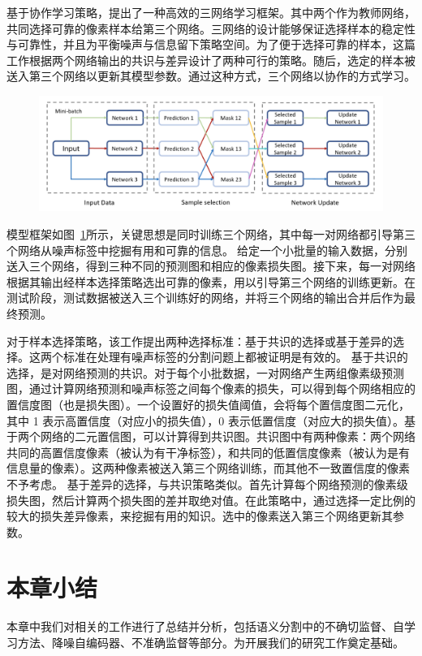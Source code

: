 \citet{Zhang2020RobustMI} 基于协作学习策略，提出了一种高效的三网络学习框架。其中两个作为教师网络，共同选择可靠的像素样本给第三个网络。三网络的设计能够保证选择样本的稳定性与可靠性，并且为平衡噪声与信息留下策略空间。为了便于选择可靠的样本，这篇工作根据两个网络输出的共识与差异设计了两种可行的策略。随后，选定的样本被送入第三个网络以更新其模型参数。通过这种方式，三个网络以协作的方式学习。
    \begin{figure}[tbp]
        \centering 
        \includegraphics[width=1.0\textwidth]{img/c2/rel_c3.png}
        \label{c2_fig13}
    \end{figure}
模型框架如图~\ref{c2_fig13}所示，关键思想是同时训练三个网络，其中每一对网络都引导第三个网络从噪声标签中挖掘有用和可靠的信息。给定一个小批量的输入数据，分别送入三个网络，得到三种不同的预测图和相应的像素损失图。接下来，每一对网络根据其输出经样本选择策略选出可靠的像素，用以引导第三个网络的训练更新。在测试阶段，测试数据被送入三个训练好的网络，并将三个网络的输出合并后作为最终预测。

对于样本选择策略，该工作提出两种选择标准：基于共识的选择或基于差异的选择。这两个标准在处理有噪声标签的分割问题上都被证明是有效的。
基于共识的选择，是对网络预测的共识。对于每个小批数据，一对网络产生两组像素级预测图，通过计算网络预测和噪声标签之间每个像素的损失，可以得到每个网络相应的置信度图（也是损失图）。一个设置好的损失值阈值，会将每个置信度图二元化，其中 1 表示高置信度（对应小的损失值），0 表示低置信度（对应大的损失值）。基于两个网络的二元置信图，可以计算得到共识图。共识图中有两种像素：两个网络共同的高置信度像素（被认为有干净标签），和共同的低置信度像素（被认为是有信息量的像素）。这两种像素被送入第三个网络训练，而其他不一致置信度的像素不予考虑。
基于差异的选择，与共识策略类似。首先计算每个网络预测的像素级损失图，然后计算两个损失图的差并取绝对值。在此策略中，通过选择一定比例的较大的损失差异像素，来挖掘有用的知识。选中的像素送入第三个网络更新其参数。


\section{本章小结}
本章中我们对相关的工作进行了总结并分析，包括语义分割中的不确切监督、自学习方法、降噪自编码器、不准确监督等部分。为开展我们的研究工作奠定基础。


